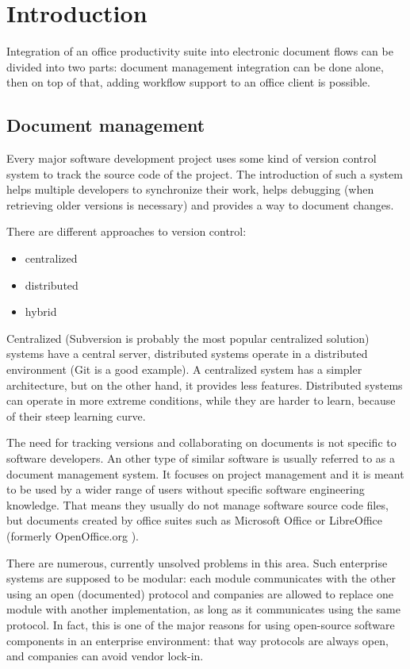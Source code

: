 \chapter{Introduction}

Integration of an office productivity suite into electronic document flows can be
divided into two parts: document management integration can be done alone, then
on top of that, adding workflow support to an office client is possible.

\section{Document management}
\label{sec:intro-docmgmt}

Every major software development project uses some kind of version control
system to track the source code of the project. The introduction of such a system
helps multiple developers to synchronize their work, helps debugging (when
retrieving older versions is necessary) and provides a way to document changes.

There are different approaches to version control:

\begin{itemize}
\item centralized
\item distributed
\item hybrid
\end{itemize}

Centralized (Subversion \cite{subversion} is probably the most
popular centralized solution) systems have a central server, distributed
systems operate in a distributed environment (Git \cite{git} is a good
example). A centralized system has a simpler architecture, but on the other
hand, it provides less features. Distributed systems can operate in more extreme
conditions, while they are harder to learn, because of their steep learning
curve.

The need for tracking versions and collaborating on documents is not specific to
software developers. An other type of similar software is usually referred to as
a document management system. It focuses on project management and it is meant to be
used by a wider range of users without specific software engineering knowledge.
That means they usually do not manage software source code files, but documents
created by office suites such as Microsoft Office \cite{mso} or
LibreOffice \cite{lo} (formerly OpenOffice.org \cite{ooo}).

There are numerous, currently unsolved problems in this area. Such enterprise
systems are supposed to be modular: each module communicates with the other
using an open (documented) protocol and companies are allowed to replace one
module with another implementation, as long as it communicates using the same
protocol. In fact, this is one of the major reasons for using open-source
software components in an enterprise environment: that way protocols are always
open, and companies can avoid vendor lock-in.

